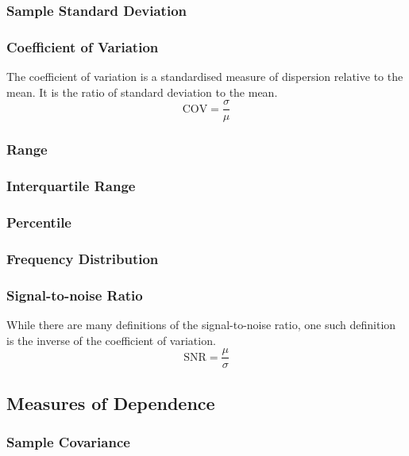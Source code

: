 \documentclass[11pt]{report} %
\begin{document}
\subsubsection{Sample Standard Deviation}

\subsubsection{Coefficient of Variation}

The coefficient of variation is a standardised measure of dispersion relative to the mean. It is the ratio of standard deviation to the mean.
\begin{equation}
\mathrm{COV} = \dfrac{\sigma}{\mu}
\end{equation}

\subsubsection{Range}

\subsubsection{Interquartile Range}

\subsubsection{Percentile}

\subsubsection{Frequency Distribution}

\subsubsection{Signal-to-noise Ratio}

While there are many definitions of the signal-to-noise ratio, one such definition is the inverse of the coefficient of variation.
\begin{equation}
\mathrm{SNR} = \dfrac{\mu}{\sigma}
\end{equation}

\subsection{Measures of Dependence}

\subsubsection{Sample Covariance}
\end{document}

